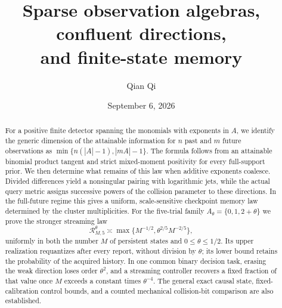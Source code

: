 \documentclass[11pt]{amsart}
\title[Confluent observation algebras and memory]{Sparse observation algebras, confluent directions,\\ and finite-state memory}
\author{Qian Qi}
\date{September 6, 2026}
\theoremstyle{definition}\newtheorem{definition}[theorem]{Definition}
\theoremstyle{remark}\newtheorem{remark}[theorem]{Remark}
\begin{document}
\begin{abstract}
For a positive finite detector spanning the monomials with exponents in
$A$, we identify the generic dimension of the attainable information for
$n$ past and $m$ future observations as
$\min\{n(|A|-1),|mA|-1\}$. The formula follows from an attainable
binomial product tangent and strict mixed-moment positivity for every
full-support prior. We then determine what remains of this law when
additive exponents coalesce. Divided differences yield a nonsingular
pairing with logarithmic jets, while the actual query metric assigns
successive powers of the collision parameter to these directions. In
the full-future regime this gives a uniform, scale-sensitive checkpoint
memory law determined by the cluster multiplicities. For the five-trial
family $A_\theta=\{0,1,2+\theta\}$ we prove the stronger streaming law
\[
 \mathcal R_{M,5}^{\theta}\asymp
       \max\{M^{-1/2},\theta^{2/5}M^{-2/5}\},
\]
uniformly in both the number $M$ of persistent states and
$0\le\theta\le1/2$. Its upper realization requantizes after every
report, without division by $\theta$; its lower bound retains the
probability of the acquired history. In one common binary decision task,
erasing the weak direction loses order $\theta^2$, and a streaming
controller recovers a fixed fraction of that value once
$M$ exceeds a constant times $\theta^{-4}$. The general exact causal
state, fixed-calibration control bounds, and a counted mechanical
collision-bit comparison are also established.
\end{abstract}
\maketitle











\end{document}
